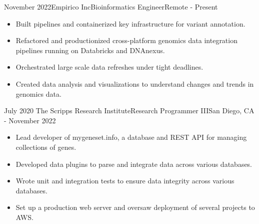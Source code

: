 %
%
%
\begin{experiences}
  \experience
    {November 2022}{Empirico Inc}{Bioinformatics Engineer}{Remote}
    {- Present} {
    \begin{itemize}
    \item Built pipelines and containerized key infrastructure for variant annotation.
    \item Refactored and productionized cross-platform genomics data integration pipelines running on Databricks and DNAnexus.
    \item Orchestrated large scale data refreshes under tight deadlines.
    \item Created data analysis and visualizations to understand changes and trends in genomics data.
    \end{itemize}
    }
    
  \emptySeparator
  \experience
    {July 2020}   {The Scripps Research Institute}{Research Programmer III}{San Diego, CA}
    {- November 2022} {
    \begin{itemize}
    \item Lead developer of mygeneset.info, a database and REST API for managing collections of genes.
    \item Developed data plugins to parse and integrate data across various databases.
    \item Wrote unit and integration tests to ensure data integrity across various databases.
    \item Set up a production web server and oversaw deployment of several projects to AWS.
    \end{itemize}
    }
    

\end{experiences}
